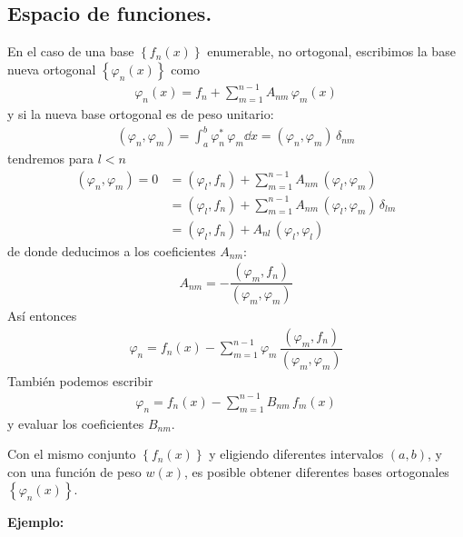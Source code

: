 \subsection*{Espacio de funciones.}
En el caso de una base $\left\{f_{n} (x) \right\}$ enumerable, no ortogonal, escribimos la base nueva ortogonal $\left\{ \varphi_{n} (x) \right\}$ como
\begin{align}
\varphi_{n} (x) = f_{n} + \sum_{m=1}^{n-1} A_{nm} \, \varphi_{m} (x)
\label{eq:ecuacion_05_26}
\end{align}
y si la nueva base ortogonal es de peso unitario:
\begin{align*}
(\varphi_{n}, \varphi_{m}) = \int_{a}^{b} \varphi_{n}^{*} \, \varphi_{m} \dd{x} = (\varphi_{n}, \varphi_{m}) \, \delta_{nm}
\end{align*}
tendremos para $l < n$
\begin{align*}
(\varphi_{n}, \varphi_{m}) = 0 &= (\varphi_{l}, f_{n}) + \sum_{m=1}^{n-1} A_{nm} \, (\varphi_{l}, \varphi_{m}) \\
&= (\varphi_{l}, f_{n}) + \sum_{m=1}^{n-1} A_{nm} \, (\varphi_{l}, \varphi_{m}) \, \delta_{lm} \\
&= (\varphi_{l}, f_{n}) + A_{nl} \, (\varphi_{l}, \varphi_{l}) 
\end{align*}
de donde deducimos a los coeficientes $A_{nm}$:
\begin{align*}
A_{nm} = - \dfrac{(\varphi_{m}, f_{n})}{(\varphi_{m}, \varphi_{m})}
\end{align*}
Así entonces
\begin{align*}
\varphi_{n} = f_{n} (x) - \sum_{m=1}^{n-1} \varphi_{m} \, \dfrac{(\varphi_{m}, f_{n})}{(\varphi_{m}, \varphi_{m})}
\end{align*}
También podemos escribir
\begin{align}
\varphi_{n} = f_{n} (x) - \sum_{m=1}^{n-1} B_{nm} \, f_{m} (x)
\label{eq:ecuacion_05_27}
\end{align}
y evaluar los coeficientes $B_{nm}$.
\par
Con el mismo conjunto $\left\{ f_{n}(x) \right\}$ y eligiendo diferentes intervalos $(a, b)$, y con una función de peso $w(x)$, es posible obtener diferentes bases ortogonales $\left\{ \varphi_{n} (x) \right\}$.
\par
\textbf{Ejemplo: }


